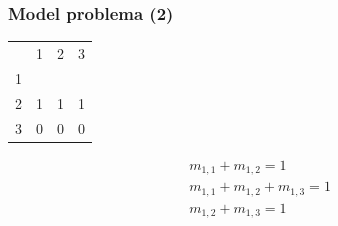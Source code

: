 \documentclass{beamer}
\begin{document}
    \begin{frame}[t]
        \frametitle{Model problema (2)}

        \begin{table}[ht]
            \centering
            \begin{tabular}{llll}
                                   & 1                      & 2                      & 3                      \\ \cline{2-4}
            \multicolumn{1}{l|}{1} & \multicolumn{1}{l|}{}  & \multicolumn{1}{l|}{}  & \multicolumn{1}{l|}{}  \\ \cline{2-4}
            \multicolumn{1}{l|}{2} & \multicolumn{1}{l|}{1} & \multicolumn{1}{l|}{1} & \multicolumn{1}{l|}{1} \\ \cline{2-4}
            \multicolumn{1}{l|}{3} & \multicolumn{1}{l|}{0} & \multicolumn{1}{l|}{0} & \multicolumn{1}{l|}{0}  \\ \cline{2-4}
            \end{tabular}
        \end{table}

        \begin{align*}
            m_{1, 1} + m_{1, 2} = 1 \\
            m_{1, 1} + m_{1, 2} + m_{1, 3} = 1 \\
            m_{1, 2} + m_{1, 3} = 1 \\
        \end{align*}

    \end{frame}
\end{document}
